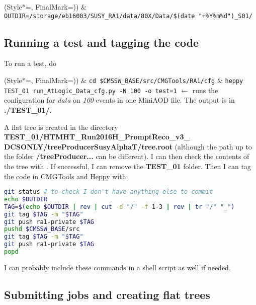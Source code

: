 
\begin{easylist}
\ListProperties(Style*=, FinalMark={)})
& \texttt{OUTDIR=/storage/eb16003/SUSY\_RA1/data/80X/Data/\$(date "+\%Y\%m\%d")\_S01/}
\end{easylist}

\subsection{Running a test and tagging the code}

To run a test, do

\begin{easylist}
\ListProperties(Style*=, FinalMark={)})
& \texttt{cd \$CMSSW\_BASE/src/CMGTools/RA1/cfg}
& \texttt{heppy TEST\_01 run\_AtLogic\_Data\_cfg.py -N 100 -o test=1} $\leftarrow$ runs the configuration for \emph{data} on \emph{100} events in one MiniAOD file. The output is in \textbf{./TEST\_01/}.
\end{easylist}

A flat tree is created in the directory \textbf{TEST\_01/HTMHT\_Run2016H\_PromptReco\_v3\_
DCSONLY/treeProducerSusyAlphaT/tree.root} (although the path up to the folder \textbf{/treeProducer...} can be different). I can then check the contents of the tree with \ROOT. If successful, I can remove the \textbf{TEST\_01} folder. Then I can tag the code in CMGTools and Heppy with:

\begin{lstlisting}[belowskip=-0.7cm, language=sh, numbers=none]
git status # to check I don't have anything else to commit
echo $OUTDIR
TAG=$(echo $OUTDIR | rev | cut -d "/" -f 1-3 | rev | tr "/" "_")
git tag $TAG -m "$TAG"
git push ra1-private $TAG
pushd $CMSSW_BASE/src
git tag $TAG -m "$TAG"
git push ra1-private $TAG
popd
\end{lstlisting}

I can probably include these commands in a shell script as well if needed.

\subsection{Submitting jobs and creating flat trees}

